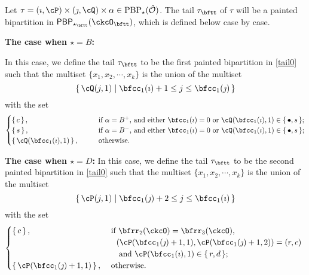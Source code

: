 \documentclass[12pt,a4paper]{amsart}
\newcommand{\CO}{{\mathcal {O}}}
\numberwithin{equation}{section}
\theoremstyle{remark}
\def\PBP{\mathsf{PBP}}
\begin{document}
\medskip


Let $ \tau=(\imath,\cP)\times(\jmath,\cQ)\times \alpha \in
\mathrm{PBP}_\star(\check \CO) $. The tail $\tau_\bftt$ of $\tau$ will be a painted bipartition in
$\PBP_{\star_\bftt}(\ckcO_\bftt)$, which is defined below case by case.

{\bfseries The case when $\star = B$:}

In this case, we define the tail $\tau_\bftt$ to be the first painted bipartition in \eqref{tail0} such that the multiset $\{x_1, x_2, \cdots, x_k\}$ is the
union of the multiset
\[
  \set{\cQ(j,1)| \bfcc_{1}(\imath)+1 \leq j \leq  \bfcc_{1}(\jmath) }
\]
with the set
\[
  \begin{cases}
 \set{c}, &
 \qquad
  \text{if $\alpha = B^+$, and either $\bfcc_{1}(\imath)=0$ or $\cQ(\bfcc_{1}(\imath),1)\in \set{\bullet,s}$};  \\
 \set{s},&
  \qquad \text{if $\alpha = B^-$, and either $\bfcc_{1}(\imath)=0$ or $\cQ(\bfcc_{1}(\imath),1)\in \set{\bullet,s}$}; \\
\set{\cQ(\bfcc_{1}(\imath),1)},&
\qquad
\text{otherwise.}
\end{cases}
\]

{\bfseries The case when $\star = D$:}
In this case, we define the tail $\tau_\bftt$ to be the second painted
bipartition in \eqref{tail0} such that the multiset $\{x_1, x_2, \cdots, x_k\}$
is the union of the multiset
\[
\set{\cP(j,1)| \bfcc_{1}(\jmath)+2 \leq j \leq \bfcc_{1}(\imath)}
\]
with the set
\[
\begin{cases}
    \set{c},                          &
    \ \text{if $\bfrr_2(\ckcO)=\bfrr_3(\ckcO)$,}                                                                         \\
                                      & \quad \text{$(\cP(\bfcc_{1}(\jmath)+1,1) ,\cP(\bfcc_{1}(\jmath)+1,2)) = (r,c)$ } \\
                                      & \quad \text{ and $\cP(\bfcc_1(\imath),1)\in \set{r,d}$};                                       \\
    \set{\cP(\bfcc_{1}(\jmath)+1,1)}, &
    \    \text{otherwise.}
  \end{cases}
\]
\end{document}
